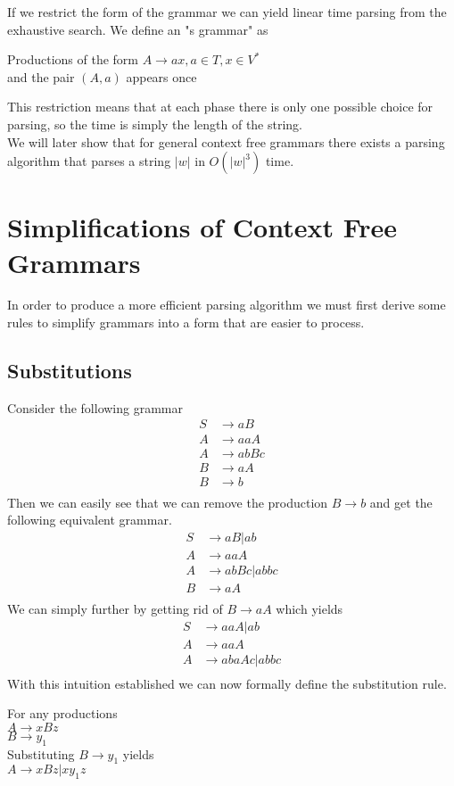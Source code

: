 \documentclass[11pt]{exam}
\begin{document}
If we restrict the form of the grammar we can yield linear time parsing from the exhaustive search. We define an "s grammar" as
\begin{center}
Productions of the form $A \rightarrow ax, a \in T, x \in V^*$\\
and the pair $(A,a)$ appears once
\end{center}
This restriction means that at each phase there is only one possible choice for parsing, so the time is simply the length of the string.\\

We will later show that for general context free grammars there exists a parsing algorithm that parses a string $|w|$ in $O(|w|^3)$ time.


\newpage

\section{Simplifications of Context Free Grammars}

In order to produce a more efficient parsing algorithm we must first derive some rules to simplify grammars into a form that are easier to process.

\subsection{Substitutions}

Consider the following grammar
\begin{align*}
S &\rightarrow aB\\
A &\rightarrow aaA\\
A &\rightarrow abBc\\
B &\rightarrow aA\\
B &\rightarrow b\\
\end{align*}
Then we can easily see that we can remove the production $B \rightarrow b$ and get the following equivalent grammar.
\begin{align*}
S &\rightarrow aB | ab\\
A &\rightarrow aaA\\
A &\rightarrow abBc | abbc\\
B &\rightarrow aA\\
\end{align*}
We can simply further by getting rid of $B \rightarrow aA$ which yields
\begin{align*}
S &\rightarrow aaA | ab\\
A &\rightarrow aaA\\
A &\rightarrow abaAc | abbc\\
\end{align*}
With this intuition established we can now formally define the substitution rule. 
\begin{center}
For any productions\\
$A \rightarrow xBz$\\
$B \rightarrow y_1$\\
Substituting $B \rightarrow y_1$ yields\\
$A \rightarrow xBz | xy_1z$
\end{center}
\end{document}
